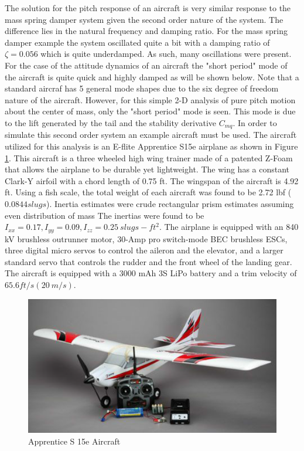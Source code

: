 The solution for the pitch response of an aircraft is very similar response to the mass spring damper system given the second order nature of the system. The difference lies in the natural frequency and damping ratio. For the mass spring damper example the system oscillated quite a bit with a damping ratio of $\zeta = 0.056$ which is quite underdamped. As such, many oscillations were present. For the case of the attitude dynamics of an aircraft the "short period" mode of the aircraft is quite quick and highly damped as will be shown below. Note that a standard aircraf has 5 general mode shapes due to the six degree of freedom nature of the aircraft. However, for this simple 2-D analysis of pure pitch motion about the center of mass, only the "short period" mode is seen. This mode is due to the lift generated by the tail and the stability derivative $C_{mq}$. In order to simulate this second order system an example aircraft must be used. The aircraft utilized for this analysis is an E-flite Apprentice S15e airplane \cite{apprentice} as shown in Figure \ref{f:apprentice}. This aircraft is a three wheeled high wing trainer made of a patented Z-Foam that allows the airplane to be durable yet lightweight. The wing has a constant Clark-Y airfoil with a chord length of 0.75 ft. The wingspan of the aircraft is 4.92 ft. Using a fish scale, the total weight of each aircraft was found to be 2.72 lbf ($0.0844 slugs$). Inertia estimates were crude rectangular prism estimates assuming even distribution of mass The inertias were found to be $I_{xx} = 0.17,I_{yy} = 0.09,I_{zz} = 0.25~slugs-ft^2$. The airplane is equipped with an 840 kV brushless outrunner motor, 30-Amp pro switch-mode BEC brushless ESCs, three digital micro servos to control the aileron and the elevator, and a larger standard servo that controls the rudder and the front wheel of the landing gear. The aircraft is equipped with a 3000 mAh 3S LiPo battery and a trim velocity of $65.6 ft/s (20~m/s)$.
\begin{figure}[H]
\centering
\includegraphics[width=0.6\linewidth]{Figures/apprentice.PNG}
\caption{Apprentice S 15e Aircraft}
\label{f:apprentice}
\end{figure}
